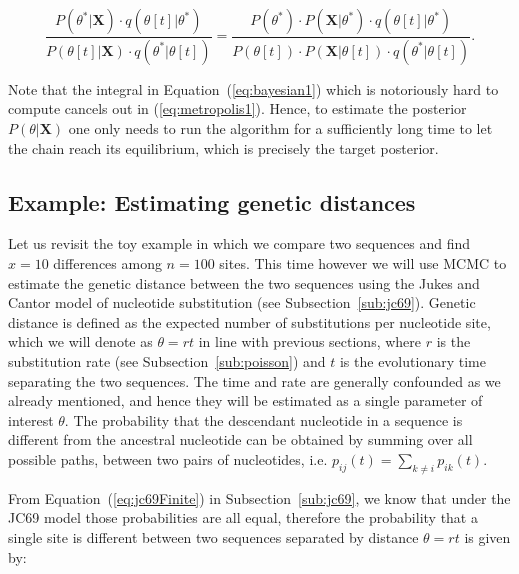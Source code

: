\begin{equation}
\frac{P\left(\theta^{*}|\mathbf{X}\right)\cdot q\left(\theta\left[t\right]|\theta^{*}\right)}{P\left(\theta\left[t\right]|\mathbf{X}\right)\cdot q\left(\theta^{*}|\theta\left[t\right]\right)}=\frac{P(\theta^{*})\cdot P\left(\mathbf{X}|\theta^{*}\right)\cdot q\left(\theta\left[t\right]|\theta^{*}\right)}{P(\theta\left[t\right])\cdot P\left(\mathbf{X}|\theta\left[t\right]\right)\cdot q\left(\theta^{*}|\theta\left[t\right]\right)}.
\label{eq:metropolis1}
\end{equation}

Note that the integral in Equation~(\ref{eq:bayesian1}) which is notoriously hard to compute cancels out in (\ref{eq:metropolis1}).
Hence, to estimate the posterior $P\left(\theta|\mathbf{X}\right)$ one only needs to run the algorithm for a sufficiently long time to let the chain reach its equilibrium, which is precisely the target posterior.

\subsection{Example: Estimating genetic distances}

Let us revisit the toy example in which we compare two sequences and find $x=10$ differences among $n=100$ sites.
This time however we will use MCMC to estimate the genetic distance between the two sequences using the Jukes and Cantor model of nucleotide substitution (see Subsection~\ref{sub:jc69}).
Genetic distance is defined as the expected number of substitutions per nucleotide site, which we will denote as $\theta=rt$ in line with previous sections, where $r$ is the substitution rate (see Subsection~\ref{sub:poisson}) and $t$ is the evolutionary time separating the two sequences.
The time and rate are generally confounded as we already mentioned, and hence they will be estimated as a single parameter of interest $\theta$.
The probability that the descendant nucleotide in a sequence is different from the ancestral nucleotide can be obtained by summing over all possible paths, between two pairs of nucleotides, i.e. $p_{ij}(t)=\underset{k\neq i}{\sum}p_{ik}(t)$.

From Equation~(\ref{eq:jc69Finite}) in Subsection~\ref{sub:jc69}, we know that under the JC69 model those probabilities are all equal, therefore the probability that a single site is different between two sequences separated by distance $\theta=rt$ is given by:

